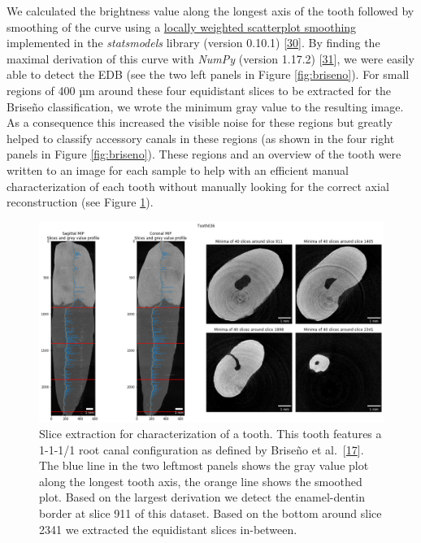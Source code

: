 \documentclass[
  american,
]{article}
\begin{document}
We calculated the brightness value along the longest axis of the tooth followed by smoothing of the curve using a \href{https://www.statsmodels.org/devel/generated/statsmodels.nonparametric.smoothers_lowess.lowess.html}{locally weighted scatterplot smoothing} implemented in the \emph{statsmodels} library (version 0.10.1) {[}\protect\hyperlink{ref-E4OYV0qi}{30}{]}.
By finding the maximal derivation of this curve with \emph{NumPy} (version 1.17.2) {[}\protect\hyperlink{ref-OiM2HfsY}{31}{]}, we were easily able to detect the EDB (see the two left panels in Figure \ref{fig:briseno}).
For small regions of 400 µm around these four equidistant slices to be extracted for the Briseño classification, we wrote the minimum gray value to the resulting image.
As a consequence this increased the visible noise for these regions but greatly helped to classify accessory canals in these regions (as shown in the four right panels in Figure \ref{fig:briseno}).
These regions and an overview of the tooth were written to an image for each sample to help with an efficient manual characterization of each tooth without manually looking for the correct axial reconstruction (see Figure \ref{fig:extractedslices}).

\begin{figure}
\hypertarget{fig:extractedslices}{%
\centering
\includegraphics{images/Tooth036.ExtractedSlices.png}
\caption{Slice extraction for characterization of a tooth.
This tooth features a 1-1-1/1 root canal configuration as defined by Briseño et al.~{[}\protect\hyperlink{ref-ZTgDEakx}{17}{]}.
The blue line in the two leftmost panels shows the gray value plot along the longest tooth axis, the orange line shows the smoothed plot.
Based on the largest derivation we detect the enamel-dentin border at slice 911 of this dataset.
Based on the bottom around slice 2341 we extracted the equidistant slices in-between.}\label{fig:extractedslices}
}
\end{figure}
\end{document}
